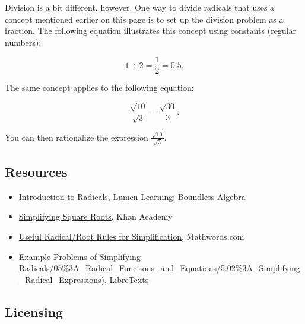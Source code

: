 Division is a bit different, however. One way to divide radicals that uses a concept
mentioned earlier on this page is to set up the division problem as a fraction. The
following equation illustrates this concept using constants (regular numbers):



\[
1 \div 2 = \frac{1}{2} = 0.5.
\]



The same concept applies to the following equation:



\[
\frac{\sqrt{10}}{\sqrt{3}} = \frac{\sqrt{30}}{3}.
\]


You can then rationalize the expression $\frac{\sqrt{10}}{\sqrt{3}}$.




\subsection{Resources}
\label{sss:reso-55b5}




\begin{itemize}
    \item \href{https://courses.lumenlearning.com/boundless-algebra/chapter/radicals/}{Introduction to Radicals}, Lumen Learning: Boundless Algebra
    \item \href{https://www.khanacademy.org/math/algebra/x2f8bb11595b61c86:rational-exponents-radicals/x2f8bb11595b61c86:simplifying-square-roots/v/simplifying-square-roots-1}{Simplifying Square Roots}, Khan Academy
    \item \href{https://www.mathwords.com/r/radical_rules.htm}{Useful Radical/Root Rules for Simplification}, Mathwords.com
    \item \href{https://math.libretexts.org/Bookshelves/Algebra/Book\%3A_Advanced_Algebra_(redden}{Example Problems of Simplifying Radicals}/05\%3A\_Radical\_Functions\_and\_Equations/5.02\%3A\_Simplifying\_Radical\_Expressions), LibreTexts
\end{itemize}


\subsection{Licensing}
\label{sss:lice-73523}





